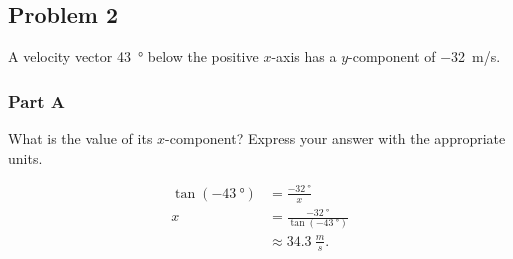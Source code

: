 
\newpage

\subsection{Problem 2}

A velocity vector \SI{43}{\degree} below the positive $x$-axis has a $y$-component of \SI{-32}{m/s}.

\subsubsection{Part A}

What is the value of its $x$-component? Express your answer with the appropriate units.

\begin{solution}
	\begin{align*}
		\tan \left( \SI{-43}{\degree} \right) &= \frac{\SI{-32}{\degree}}{x} \\
		x &= \frac{\SI{-32}{\degree}}{\tan \left( \SI{-43}{\degree} \right)} \\
		&\approx \SI{34.3}{\frac{m}{s}}
		.\end{align*}
\end{solution}
